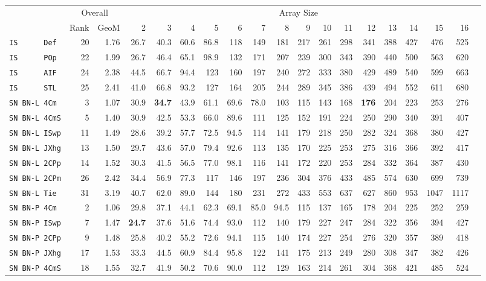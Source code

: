 \begin{tabular}{l | r @{~~} r | r@{~~}r@{~~}r@{~~}r@{~~}r@{~~}r@{~~}r@{~~}r@{~~}r@{~~}r@{~~}r@{~~}r@{~~}r@{~~}r@{~~}r@{~~}r|}
 & \multicolumn{2}{c|}{Overall} & \multicolumn{15}{c}{Array Size} \\
 & Rank & GeoM & 2&3&4&5&6&7&8&9&10&11&12&13&14&15&16\\ \hline
\verb+IS      Def+ & 20 & 1.76 & 26.7&40.3&60.6&86.8&118&149&181&217&261&298&341&388&427&476&525\\
\verb+IS      POp+ & 22 & 1.99 & 26.7&46.4&65.1&98.9&132&171&207&239&300&343&390&440&500&563&620\\
\verb+IS      AIF+ & 24 & 2.38 & 44.5&66.7&94.4&123&160&197&240&272&333&380&429&489&540&599&663\\
\verb+IS      STL+ & 25 & 2.41 & 41.0&66.8&93.2&127&164&205&244&289&345&386&439&494&552&611&680\smallskip \\
\verb+SN BN-L 4Cm + & 3 & 1.07 & 30.9&\textbf{34.7}&43.9&61.1&69.6&78.0&103&115&143&168&\textbf{176}&204&223&253&276\\
\verb+SN BN-L 4CmS+ & 5 & 1.40 & 30.9&42.5&53.3&66.0&89.6&111&125&152&191&224&250&290&340&391&407\\
\verb+SN BN-L ISwp+ & 11 & 1.49 & 28.6&39.2&57.7&72.5&94.5&114&141&179&218&250&282&324&368&380&427\\
\verb+SN BN-L JXhg+ & 13 & 1.50 & 29.7&43.6&57.0&79.4&92.6&113&135&170&225&253&275&316&366&392&417\\
\verb+SN BN-L 2CPp+ & 14 & 1.52 & 30.3&41.5&56.5&77.0&98.1&116&141&172&220&253&284&332&364&387&430\\
\verb+SN BN-L 2CPm+ & 26 & 2.42 & 34.4&56.9&77.3&117&146&197&236&304&376&433&485&574&630&699&739\\
\verb+SN BN-L Tie + & 31 & 3.19 & 40.7&62.0&89.0&144&180&231&272&433&553&637&627&860&953&1047&1117\smallskip \\
\verb+SN BN-P 4Cm + & 2 & 1.06 & 29.8&37.1&44.1&62.3&69.1&85.0&94.5&115&137&165&178&204&225&252&259\\
\verb+SN BN-P ISwp+ & 7 & 1.47 & \textbf{24.7}&37.6&51.6&74.4&93.0&112&140&179&227&247&284&322&356&394&427\\
\verb+SN BN-P 2CPp+ & 9 & 1.48 & 25.8&40.2&55.2&72.6&94.1&115&140&174&227&254&276&320&357&389&418\\
\verb+SN BN-P JXhg+ & 17 & 1.53 & 33.3&44.5&60.9&84.4&95.8&122&141&175&213&249&280&308&347&382&426\\
\verb+SN BN-P 4CmS+ & 18 & 1.55 & 32.7&41.9&50.2&70.6&90.0&112&129&163&214&261&304&368&421&485&524\\

\end{tabular}
